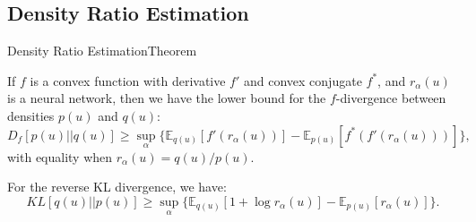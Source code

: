 \documentclass[handout]{beamer}
\begin{document}
\subsection{Density Ratio Estimation}

\begin{frame}{Density Ratio Estimation}{Theorem}
\begin{theorem}
If $f$ is a convex function with derivative $f'$ and convex conjugate $f^*$, and $r_\alpha(u)$ is a neural network, then we have the lower bound for the $f$-divergence between densities $p(u)$ and $q(u)$:
\[D_f [p(u)||q(u)]\geq \sup_{\alpha} \{\mathbb{E}_{q(u)}[f'(r_\alpha(u))]-\mathbb{E}_{p(u)}[f^*(f'(r_\alpha(u)))]\},\]
with equality when $r_\alpha(u)=q(u)/p(u)$.
\end{theorem}
\begin{example}
For the reverse KL divergence, we have:
\[KL[q(u)||p(u)]\geq \sup_{\alpha}\{\mathbb{E}_{q(u)}[1+\log r_\alpha(u)]-\mathbb{E}_{p(u)}[r_\alpha(u)]\}.\]
\end{example}
\end{frame}
\end{document}
